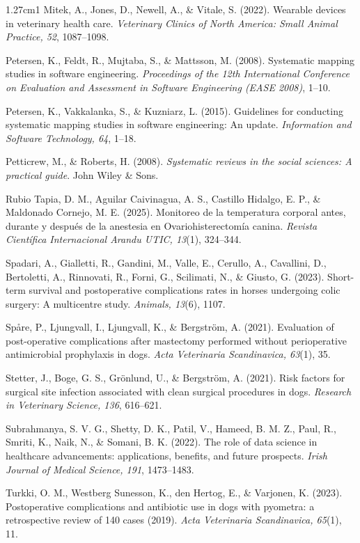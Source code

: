 \documentclass[stu, spanish]{apa7}
\begin{document}
\begin{hangparas}{1.27cm}{1}
Mitek, A., Jones, D., Newell, A., \& Vitale, S. (2022). Wearable devices in veterinary health care. \textit{Veterinary Clinics of North America: Small Animal Practice, 52}, 1087--1098.

Petersen, K., Feldt, R., Mujtaba, S., \& Mattsson, M. (2008). Systematic mapping studies in software engineering. \textit{Proceedings of the 12th International Conference on Evaluation and Assessment in Software Engineering (EASE 2008)}, 1--10.

Petersen, K., Vakkalanka, S., \& Kuzniarz, L. (2015). Guidelines for conducting systematic mapping studies in software engineering: An update. \textit{Information and Software Technology, 64}, 1--18.

Petticrew, M., \& Roberts, H. (2008). \textit{Systematic reviews in the social sciences: A practical guide}. John Wiley \& Sons.

Rubio Tapia, D. M., Aguilar Caivinagua, A. S., Castillo Hidalgo, E. P., \& Maldonado Cornejo, M. E. (2025). Monitoreo de la temperatura corporal antes, durante y despu\'{e}s de la anestesia en Ovariohisterectom\'{i}a canina. \textit{Revista Cient\'{i}fica Internacional Arandu UTIC, 13}(1), 324--344.

Spadari, A., Gialletti, R., Gandini, M., Valle, E., Cerullo, A., Cavallini, D., Bertoletti, A., Rinnovati, R., Forni, G., Scilimati, N., \& Giusto, G. (2023). Short-term survival and postoperative complications rates in horses undergoing colic surgery: A multicentre study. \textit{Animals, 13}(6), 1107.

Sp\r{a}re, P., Ljungvall, I., Ljungvall, K., \& Bergstr\"{o}m, A. (2021). Evaluation of post-operative complications after mastectomy performed without perioperative antimicrobial prophylaxis in dogs. \textit{Acta Veterinaria Scandinavica, 63}(1), 35.

Stetter, J., Boge, G. S., Gr\"{o}nlund, U., \& Bergstr\"{o}m, A. (2021). Risk factors for surgical site infection associated with clean surgical procedures in dogs. \textit{Research in Veterinary Science, 136}, 616--621.

Subrahmanya, S. V. G., Shetty, D. K., Patil, V., Hameed, B. M. Z., Paul, R., Smriti, K., Naik, N., \& Somani, B. K. (2022). The role of data science in healthcare advancements: applications, benefits, and future prospects. \textit{Irish Journal of Medical Science, 191}, 1473--1483.

Turkki, O. M., Westberg Sunesson, K., den Hertog, E., \& Varjonen, K. (2023). Postoperative complications and antibiotic use in dogs with pyometra: a retrospective review of 140 cases (2019). \textit{Acta Veterinaria Scandinavica, 65}(1), 11.


\end{hangparas}
\end{document}
